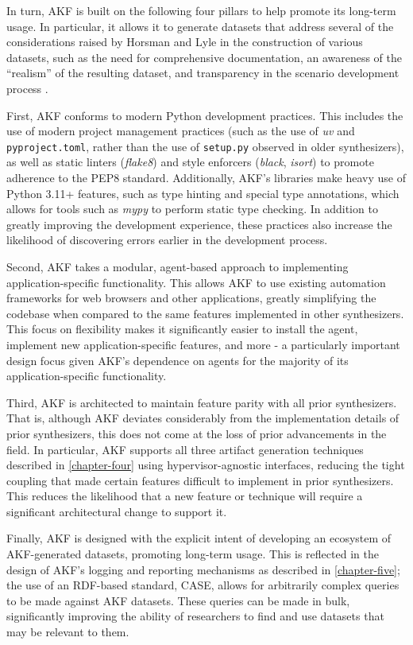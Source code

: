 In turn, AKF is built on the following four pillars to help promote its
long-term usage. In particular, it allows it to generate datasets that
address several of the considerations raised by Horsman and Lyle in the
construction of various datasets, such as the need for comprehensive
documentation, an awareness of the ``realism'' of the resulting dataset,
and transparency in the scenario development process
\cite{horsmanDatasetConstructionChallenges2021}.

First, AKF conforms to modern Python development practices. This
includes the use of modern project management practices (such as the use
of \emph{uv} and \texttt{pyproject.toml}, rather than the use of
\texttt{setup.py} observed in older synthesizers), as well as static
linters (\emph{flake8}) and style enforcers (\emph{black}, \emph{isort})
to promote adherence to the PEP8 standard. Additionally, AKF's libraries
make heavy use of Python 3.11+ features, such as type hinting and
special type annotations, which allows for tools such as \emph{mypy} to
perform static type checking. In addition to greatly improving the
development experience, these practices also increase the likelihood of
discovering errors earlier in the development process.

Second, AKF takes a modular, agent-based approach to implementing
application-specific functionality. This allows AKF to use existing
automation frameworks for web browsers and other applications, greatly
simplifying the codebase when compared to the same features implemented
in other synthesizers. This focus on flexibility makes it significantly
easier to install the agent, implement new application-specific
features, and more - a particularly important design focus given AKF's
dependence on agents for the majority of its application-specific
functionality.

Third, AKF is architected to maintain feature parity with all prior
synthesizers. That is, although AKF deviates considerably from the
implementation details of prior synthesizers, this does not come at the
loss of prior advancements in the field. In particular, AKF supports all
three artifact generation techniques described in \autoref{chapter-four} using hypervisor-agnostic interfaces, reducing the tight
coupling that made certain features difficult to implement in prior
synthesizers. This reduces the likelihood that a new feature or
technique will require a significant architectural change to support it.

Finally, AKF is designed with the explicit intent of developing an
ecosystem of AKF-generated datasets, promoting long-term usage. This is
reflected in the design of AKF's logging and reporting mechanisms as
described in \autoref{chapter-five}; the use of an
RDF-based standard, CASE, allows for arbitrarily complex queries to be
made against AKF datasets. These queries can be made in bulk,
significantly improving the ability of researchers to find and use
datasets that may be relevant to them.

